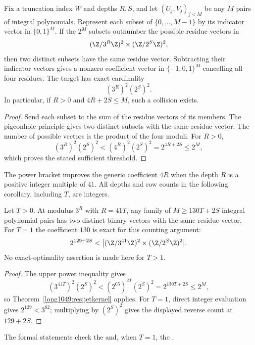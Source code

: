 \begin{theorem}\label{long1049:res:jetkernel}
Fix a truncation index \(W\) and depths \(R,S\), and let \((U_j,V_j)_{j<M}\) be any \(M\)
pairs of integral polynomials. Represent each subset of
\(\{0,\dots,M-1\}\) by its indicator vector in \(\{0,1\}^M\).
If the \(2^M\) subsets outnumber the possible residue vectors in
\[
 (\Z/3^R\Z)^2\times(\Z/2^S\Z)^2,
\]
then two distinct subsets have the same residue vector.  Subtracting their
indicator vectors gives a nonzero coefficient vector in
\(\{-1,0,1\}^M\) cancelling all four residues.  The target has exact cardinality
\[
 (3^R)^2(2^S)^2.
\]
In particular, if \(R>0\) and \(4R+2S\le M\), such a collision exists.
\end{theorem}

\begin{proof}
Send each subset to the sum of the residue vectors of its members.
The pigeonhole principle gives two distinct subsets with the same
residue vector. The number of possible vectors is the product of
the four moduli.  For \(R>0\),
\[
 (3^R)^2(2^S)^2<(4^R)^2(2^S)^2=2^{4R+2S}\le2^M,
\]
which proves the stated sufficient threshold.
\end{proof}

The power bracket improves the generic coefficient $4R$ when the depth
$R$ is a positive integer multiple of $41$. All depths and row counts
in the following corollary, including $T$, are integers.

\begin{corollary}\label{long1049:res:rankfortyone}
Let $T>0$.  At modulus $3^{R}$ with $R=41T$, any family of
$M\ge130T+2S$ integral polynomial pairs has two distinct binary vectors
with the same residue vector.  For $T=1$ the coefficient $130$ is exact for
this counting argument:
\[
 2^{129+2S}<\bigl| (\Z/3^{41}\Z)^2\times
                       (\Z/2^S\Z)^2\bigr|.
\]
No exact-optimality assertion is made here for $T>1$.
\end{corollary}

\begin{proof}
The upper power inequality gives
\[
 (3^{41T})^2(2^S)^2
 <(2^{65})^{2T}(2^S)^2=2^{130T+2S}\le2^M,
\]
so Theorem~\ref{long1049:res:jetkernel} applies.  For $T=1$, direct integer
evaluation gives $2^{129}<3^{82}$; multiplying by $(2^S)^2$ gives the
displayed reverse count at $129+2S$.
\end{proof}

\noindent The formal statements check the
and, when $T=1$, the
.


